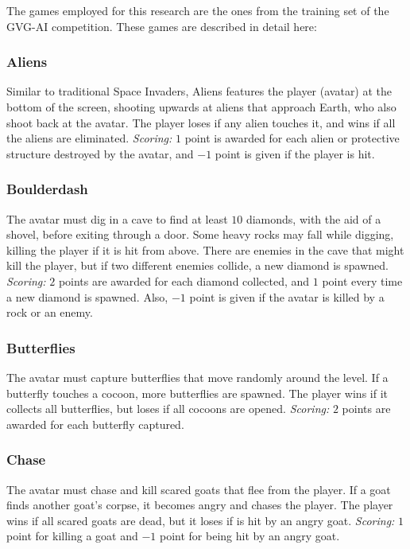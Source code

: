 \documentclass[conference]{IEEEtran}
\begin{document}
The games employed for this research are the ones from the training set of the GVG-AI competition. These games are described in detail here: 

\subsubsection{Aliens} Similar to traditional Space Invaders, Aliens features the player (avatar) at the bottom of the screen, shooting upwards at aliens that approach Earth, who also shoot back at the avatar. The player loses if any alien touches it, and wins if all the aliens are eliminated. \textit{Scoring:} $1$ point is awarded for each alien or protective structure destroyed by the avatar, and $-1$ point is given if the player is hit. 

\subsubsection{Boulderdash} The avatar must dig in a cave to find at least $10$ diamonds, with the aid of a shovel, before exiting through a door. Some heavy rocks may fall while digging, killing the player if it is hit from above. There are enemies in the cave that might kill the player, but if two different enemies collide, a new diamond is spawned. \textit{Scoring:} $2$ points are awarded for each diamond collected, and $1$ point every time a new diamond is spawned. Also, $-1$ point is given if the avatar is killed by a rock or an enemy.

\subsubsection{Butterflies} The avatar must capture butterflies that move randomly around the level. If a butterfly touches a cocoon, more butterflies are spawned. The player wins if it collects all butterflies, but loses if all cocoons are opened. \textit{Scoring:} $2$ points are awarded for each butterfly captured. 

\subsubsection{Chase} The avatar must chase and kill scared goats that flee from the player. If a goat finds another goat's corpse, it becomes angry and chases the player. The player wins if all scared goats are dead, but it loses if is hit by an angry goat. \textit{Scoring:} $1$ point for killing a goat and $-1$ point for being hit by an angry goat.
\end{document}
